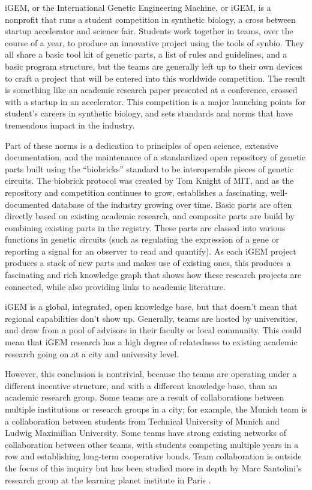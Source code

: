 \documentclass[12pt,a4paper]{article}
\begin{document}
	iGEM, or the International Genetic Engineering Machine, or iGEM, is a nonprofit that runs a student competition in synthetic biology, a cross between startup accelerator and science fair. Students work together in teams, over the course of a year, to produce an innovative project using the tools of synbio. They all share a basic tool kit of genetic parts, a list of rules and guidelines, and a basic program structure, but the teams are generally left up to their own devices to craft a project that will be entered into this worldwide competition. The result is something like an academic research paper presented at a conference, crossed with a startup in an accelerator. This competition is a major launching points for student's careers in synthetic biology, and sets standards and norms that have tremendous impact in the industry.
	
	Part of these norms is a dedication to principles of open science, extensive documentation, and the maintenance of a standardized open repository of genetic parts built using the ``biobricks'' standard to be interoperable pieces of genetic circuits. The biobrick protocol was created by Tom Knight of MIT, and as the repository and competition continues to grow, establishes a fascinating, well-documented database of the industry growing over time. Basic parts are often directly based on existing academic research, and composite parts are build by combining existing parts in the registry. These parts are classed into various functions in genetic circuits (such as regulating the expression of a gene or reporting a signal for an observer to read and quantify). As each iGEM project produces a stack of new parts and makes use of existing ones, this produces a fascinating and rich knowledge graph that shows how these research projects are connected, while also providing links to academic literature.
	
	iGEM is a global, integrated, open knowledge base, but that doesn't mean that regional capabilities don't show up. Generally, teams are hosted by universities, and draw from a pool of advisors in their faculty or local community. This could mean that iGEM research has a high degree of relatedness to existing academic research going on at a city and university level.
	
	However, this conclusion is nontrivial, because the teams are operating under a different incentive structure, and with a different knowledge base, than an academic research group. Some teams are a result of collaborations between multiple institutions or research groups in a city; for example, the Munich team is a collaboration between students from Technical University of Munich and Ludwig Maximilian University. Some teams have strong existing networks of collaboration between other teams, with students competing multiple years in a row and establishing long-term cooperative bonds. Team collaboration is outside the focus of this inquiry but has been studied more in depth by Marc Santolini's research group at the learning planet institute in Paris \parencite{santoliniIGEMModelSystem2023}.
	
\end{document}
